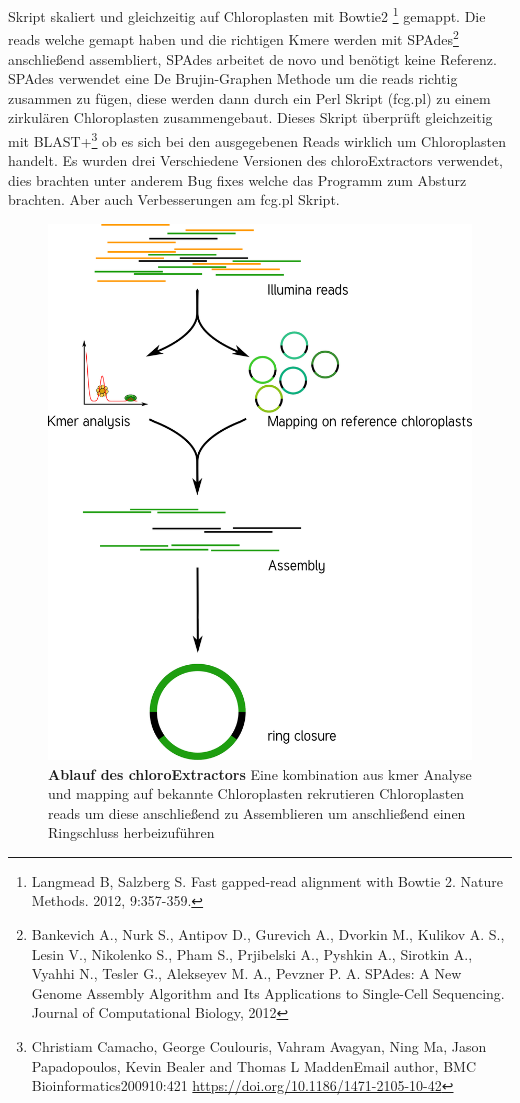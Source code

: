 \documentclass{scrartcl}
\begin{document}
Skript skaliert und gleichzeitig auf Chloroplasten mit Bowtie2 \footnote{Langmead B, Salzberg S. Fast gapped-read alignment with Bowtie 2. Nature Methods. 2012, 9:357-359.} gemappt. Die reads welche gemapt haben und die richtigen Kmere werden mit SPAdes\footnote{Bankevich A., Nurk S., Antipov D., Gurevich A., Dvorkin M., Kulikov A. S., Lesin V., Nikolenko S., Pham S., Prjibelski A., Pyshkin A., Sirotkin A., Vyahhi N., Tesler G., Alekseyev M. A., Pevzner P. A. SPAdes: A New Genome Assembly Algorithm and Its Applications to Single-Cell Sequencing.        Journal of Computational Biology, 2012} anschließend assembliert, SPAdes arbeitet de novo und benötigt
keine Referenz. SPAdes verwendet eine De Brujin-Graphen Methode um die reads richtig zusammen zu fügen, diese werden dann durch ein Perl Skript (fcg.pl) zu einem zirkulären Chloroplasten zusammengebaut. Dieses Skript überprüft
gleichzeitig mit BLAST+\footnote{Christiam Camacho, George Coulouris, Vahram Avagyan, Ning Ma, Jason Papadopoulos, Kevin Bealer and Thomas L MaddenEmail author, BMC Bioinformatics200910:421 \url{https://doi.org/10.1186/1471-2105-10-42}} ob es sich bei den ausgegebenen Reads wirklich um Chloroplasten handelt. Es wurden drei Verschiedene Versionen des chloroExtractors verwendet, dies brachten unter anderem Bug fixes welche das 
Programm zum Absturz brachten. Aber auch Verbesserungen am fcg.pl Skript.

\begin{figure}
\includegraphics[width=.9\linewidth]{./workflow.png}
\caption[Ablauf des chloroExtractors]{\textbf{Ablauf des chloroExtractors} Eine kombination aus kmer Analyse und mapping auf bekannte Chloroplasten rekrutieren Chloroplasten reads um diese anschließend zu Assemblieren um anschließend einen Ringschluss herbeizuführen}
\end{figure}
\end{document}
